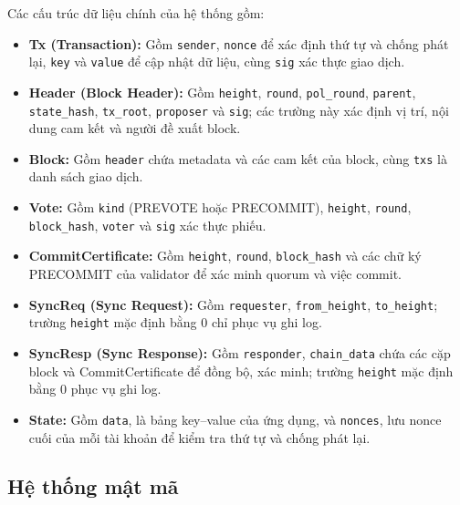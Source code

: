 Các cấu trúc dữ liệu chính của hệ thống gồm:
\begin{itemize}
    \item \textbf{Tx (Transaction):} Gồm \texttt{sender}, \texttt{nonce} để xác định thứ tự và chống phát lại, \texttt{key} và \texttt{value} để cập nhật dữ liệu, cùng \texttt{sig} xác thực giao dịch.
    \item \textbf{Header (Block Header):} Gồm \texttt{height}, \texttt{round}, \texttt{pol\_round}, \texttt{parent}, \texttt{state\_hash}, \texttt{tx\_root}, \texttt{proposer} và \texttt{sig}; các trường này xác định vị trí, nội dung cam kết và người đề xuất block.
    \item \textbf{Block:} Gồm \texttt{header} chứa metadata và các cam kết của block, cùng \texttt{txs} là danh sách giao dịch.
    \item \textbf{Vote:} Gồm \texttt{kind} (PREVOTE hoặc PRECOMMIT), \texttt{height}, \texttt{round}, \texttt{block\_hash}, \texttt{voter} và \texttt{sig} xác thực phiếu.
    \item \textbf{CommitCertificate:} Gồm \texttt{height}, \texttt{round}, \texttt{block\_hash} và các chữ ký PRECOMMIT của validator để xác minh quorum và việc commit.
    \item \textbf{SyncReq (Sync Request):} Gồm \texttt{requester}, \texttt{from\_height}, \texttt{to\_height}; trường \texttt{height} mặc định bằng 0 chỉ phục vụ ghi log.
    \item \textbf{SyncResp (Sync Response):} Gồm \texttt{responder}, \texttt{chain\_data} chứa các cặp block và CommitCertificate để đồng bộ, xác minh; trường \texttt{height} mặc định bằng 0 phục vụ ghi log.
    \item \textbf{State:} Gồm \texttt{data}, là bảng key--value của ứng dụng, và \texttt{nonces}, lưu nonce cuối của mỗi tài khoản để kiểm tra thứ tự và chống phát lại.
\end{itemize}



\subsection{Hệ thống mật mã}

